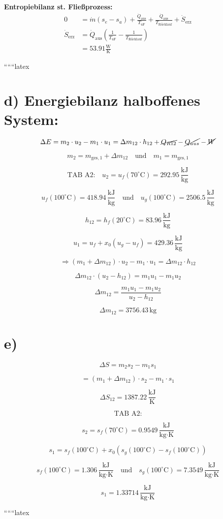 \textbf{Entropiebilanz st. Fließprozess:}
\begin{align*}
0 &= \dot{m} (s_e - s_a) + \frac{\dot{Q}_{\text{aus}}}{T_{\text{uF}}} + \frac{\dot{Q}_{\text{aus}}}{T_{\text{Rücklauf}}} + \dot{S}_{\text{erz}} \\
\dot{S}_{\text{erz}} &= \dot{Q}_{\text{aus}} \left( \frac{1}{T_{\text{uF}}} - \frac{1}{T_{\text{Rücklauf}}} \right) \\
&= 53.91 \frac{\text{W}}{\text{K}}
\end{align*}

``````latex


\section*{d) Energiebilanz halboffenes System:}

\[
\Delta E = m_2 \cdot u_2 - m_1 \cdot u_1 = \Delta m_{12} \cdot h_{12} + \cancel{Q_{R12}} - \cancel{Q_{aus}} - \cancel{W}
\]

\[
m_2 = m_{\text{ges},1} + \Delta m_{12} \quad \text{und} \quad m_1 = m_{\text{ges},1}
\]

\[
\text{TAB A2:} \quad u_2 = u_f (70^\circ \text{C}) = 292.95 \, \frac{\text{kJ}}{\text{kg}}
\]

\[
u_f (100^\circ \text{C}) = 418.94 \, \frac{\text{kJ}}{\text{kg}} \quad \text{und} \quad u_g (100^\circ \text{C}) = 2506.5 \, \frac{\text{kJ}}{\text{kg}}
\]

\[
h_{12} = h_f (20^\circ \text{C}) = 83.96 \, \frac{\text{kJ}}{\text{kg}}
\]

\[
u_1 = u_f + x_0 (u_g - u_f) = 429.36 \, \frac{\text{kJ}}{\text{kg}}
\]

\[
\Rightarrow (m_1 + \Delta m_{12}) \cdot u_2 - m_1 \cdot u_1 = \Delta m_{12} \cdot h_{12}
\]

\[
\Delta m_{12} \cdot (u_2 - h_{12}) = m_1 u_1 - m_1 u_2
\]

\[
\Delta m_{12} = \frac{m_1 u_1 - m_1 u_2}{u_2 - h_{12}}
\]

\[
\Delta m_{12} = 3756.43 \, \text{kg}
\]

\section*{e)}

\[
\Delta S = m_2 s_2 - m_1 s_1
\]

\[
= (m_1 + \Delta m_{12}) \cdot s_2 - m_1 \cdot s_1
\]

\[
\Delta S_{12} = 1387.22 \, \frac{\text{kJ}}{\text{K}}
\]

\[
\text{TAB A2:}
\]

\[
s_2 = s_f (70^\circ \text{C}) = 0.9549 \, \frac{\text{kJ}}{\text{kg} \cdot \text{K}}
\]

\[
s_1 = s_f (100^\circ \text{C}) + x_0 (s_g (100^\circ \text{C}) - s_f (100^\circ \text{C}))
\]

\[
s_f (100^\circ \text{C}) = 1.306 \, \frac{\text{kJ}}{\text{kg} \cdot \text{K}} \quad \text{und} \quad s_g (100^\circ \text{C}) = 7.3549 \, \frac{\text{kJ}}{\text{kg} \cdot \text{K}}
\]

\[
s_1 = 1.33714 \, \frac{\text{kJ}}{\text{kg} \cdot \text{K}}
\]

``````latex


